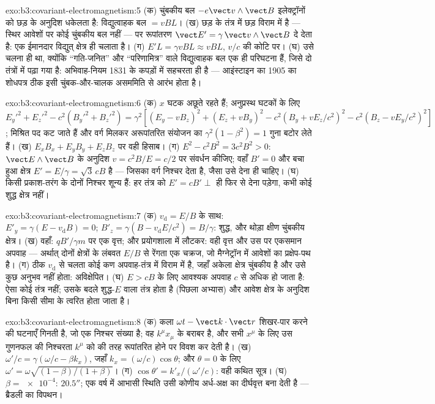 \begin{solution}{exo:b3:covariant-electromagnetism:5}
(क) चुंबकीय बल $-e\vect v\wedge\vect B$ इलेक्ट्रॉनों को छड़ के अनुदिश
धकेलता है: विद्युत्वाहक बल $= vBL$। (ख) छड़ के तंत्र में छड़ विराम
में है --- स्थिर आवेशों पर कोई चुंबकीय बल नहीं --- पर
रूपांतरण $\vect E' = \gamma\,\vect v\wedge\vect B$ दे देता है:
एक ईमानदार विद्युत् क्षेत्र ही चलाता है। (ग) $E'L = \gamma vBL
\approx vBL$, $v/c$ की कोटि पर। (घ) उसे चलना ही था, क्योंकि
``गति-जनित'' और ``परिणामित्र'' वाले विद्युत्वाहक बल एक ही परिघटना हैं,
जिसे दो तंत्रों में पढ़ा गया है: अभिवाह-नियम 1831 के कपड़ों में
सहचरता ही है --- आइंस्टाइन का 1905 का शोधपत्र ठीक इसी
चुंबक-और-चालक असममिति से आरंभ होता है।
\end{solution}

\begin{solution}{exo:b3:covariant-electromagnetism:6}
(क) $x$ घटक अछूते रहते हैं; अनुप्रस्थ घटकों के लिए
$E_y'^2 + E_z'^2 - c^2(B_y'^2 + B_z'^2) = \gamma^2[(E_y - vB_z)^2 +
(E_z + vB_y)^2 - c^2(B_y + vE_z/c^2)^2 - c^2(B_z - vE_y/c^2)^2]$;
मिश्रित पद कट जाते हैं और वर्ग मिलकर अरूपांतरित संयोजन का $\gamma^2(1 -
\beta^2) = 1$ गुना बटोर लेते हैं। (ख) $E_xB_x + E_yB_y + E_zB_z$ पर
वही हिसाब। (ग) $E^2 - c^2B^2 =
3c^2B^2 > 0$: $\vect E\wedge\vect B$ के अनुदिश $v = c^2B/E =
c/2$ पर संवर्धन कीजिए; वहाँ $B' = 0$ और बचा हुआ क्षेत्र $E' = E/\gamma =
\sqrt3\,cB$ है --- जिसका वर्ग निश्चर देता है, जैसा उसे देना ही चाहिए। (घ) किसी प्रकाश-तरंग के दोनों निश्चर
शून्य हैं: हर तंत्र को $E' = cB' \perp$ ही फिर से देना पड़ेगा, कभी कोई शुद्ध क्षेत्र नहीं।
\end{solution}

\begin{solution}{exo:b3:covariant-electromagnetism:7}
(क) $v_{\text{d}} = E/B$ के साथ: $E'_y = \gamma(E - v_{\text{d}}B) =
0$; $B'_z = \gamma(B - v_{\text{d}}E/c^2) = B/\gamma$: शुद्ध, और थोड़ा
क्षीण चुंबकीय क्षेत्र। (ख) वहाँ: $qB'/\gamma m$ पर एक वृत्त; और
प्रयोगशाला में लौटकर: वही वृत्त और उस पर एकसमान अपवाह --- अर्थात्
दोनों क्षेत्रों के लंबवत $E/B$ से रेंगता एक चक्रज, जो
मैग्नेट्रॉन में आवेशों का प्रक्षेप-पथ है। (ग) ठीक $v_{\text{d}}$ से
चलता कोई कण अपवाह-तंत्र में विराम में है, जहाँ अकेला क्षेत्र चुंबकीय है
और उसे कुछ अनुभव नहीं होता: अविक्षेपित। (घ) $E > cB$ के लिए आवश्यक
अपवाह $c$ से अधिक हो जाता है: ऐसा कोई तंत्र नहीं; उसके बदले शुद्ध-$E$
वाला तंत्र होता है (पिछला अभ्यास) और आवेश क्षेत्र के अनुदिश बिना किसी
सीमा के त्वरित होता जाता है।
\end{solution}

\begin{solution}{exo:b3:covariant-electromagnetism:8}
(क) कला $\omega t - \vect k\cdot\vect r$ शिखर-पार करने की घटनाएँ
गिनती है, जो एक निश्चर संख्या है; वह $k^\mu x_\mu$ के बराबर है, और
सभी $x^\mu$ के लिए उस गुणनफल की निश्चरता $k^\mu$ को
 की तरह रूपांतरित होने पर विवश कर देती है। (ख) $\omega'/c = \gamma(\omega/c -
\beta k_x)$, जहाँ $k_x = (\omega/c)\cos\theta$; और $\theta = 0$ के लिए
$\omega' = \omega\sqrt{(1-\beta)/(1+\beta)}$। (ग) $\cos\theta' =
k'_x/(\omega'/c)$: वही कथित सूत्र। (घ) $\beta = \num{e-4}$:
$20.5''$; एक वर्ष में आभासी स्थिति उसी कोणीय अर्ध-अक्ष का दीर्घवृत्त
बना देती है --- ब्रैडली का विपथन।
\end{solution}

